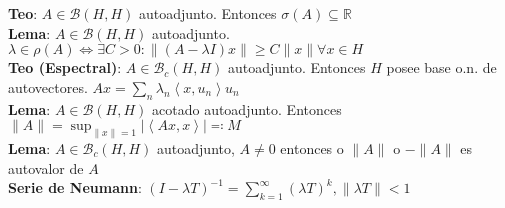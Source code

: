 \documentclass[9pt, letterpaper]{extarticle}
\newcommand{\R}{\mathbb{R}}
\newcommand{\inn}[1]{\left\langle #1\right\rangle}
\begin{document}
\begin{multicols*}{2}
\textbf{Teo}: $A\in\mathcal{B}(H,H)$ autoadjunto. Entonces $\sigma(A)\subseteq \R$\\
\textbf{Lema}: $A\in\mathcal{B}(H,H)$ autoadjunto. $\lambda\in\rho(A)\iff \exists C>0:\|(A-\lambda I)x\|\geq C\|x\|\forall x\in H$\\
\textbf{\color{red}Teo (Espectral)}: $A\in\mathcal{B}_c(H,H)$ autoadjunto. Entonces $H$ posee base o.n. de autovectores. $Ax=\sum_n \lambda_n\inn{x,u_n}u_n$\\
\textbf{Lema}: $A\in\mathcal{B}(H,H)$ acotado autoadjunto. Entonces $\|A\|=\sup_{\|x\|=1}|\inn{Ax,x}|\eqqcolon M$\\
\textbf{Lema}: $A\in\mathcal{B}_c(H,H)$ autoadjunto, $A\neq 0$ entonces o $\|A\|$ o $-\|A\|$ es autovalor de $A$\\
\textbf{Serie de Neumann}: $(I-\lambda T)^{-1}=\sum_{k=1}^\infty (\lambda T)^k, \|\lambda T\|<1$

\end{multicols*}
\end{document}
